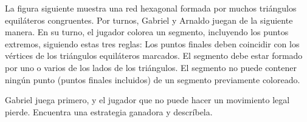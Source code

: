 La figura siguiente muestra una red hexagonal formada por muchos triángulos equiláteros congruentes. Por turnos, Gabriel y Arnaldo juegan de la siguiente manera. En su turno, el jugador colorea un segmento, incluyendo los puntos extremos, siguiendo estas tres reglas: Los puntos finales deben coincidir con los vértices de los triángulos equiláteros marcados. El segmento debe estar formado por uno o varios de los lados de los triángulos. El segmento no puede contener ningún punto (puntos finales incluidos) de un segmento previamente coloreado.

Gabriel juega primero, y el jugador que no puede hacer un movimiento legal pierde. Encuentra una estrategia ganadora y descríbela.
